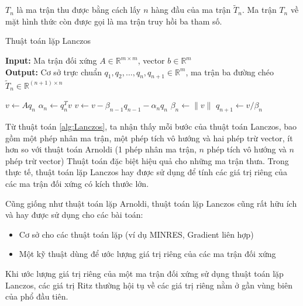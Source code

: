 \documentclass[14pt, a4paper]{article}
\numberwithin{equation}{section}
\numberwithin{algorithm}{section}
\numberwithin{figure}{section}
\numberwithin{dl}{section}
\numberwithin{md}{section}
\numberwithin{bd}{section}
\numberwithin{dn}{section}
\numberwithin{hq}{section}
\begin{document}
$T_n$ là ma trận thu được bằng cách lấy $n$ hàng đầu của ma trận $\widetilde{T}_n$. 
Ma trận $T_n$ về mặt hình thức còn được gọi là ma trận truy hồi ba tham số.

\begin{algorithm}[h!]
    \caption{Thuật toán lặp Lanczos}\label{alg:Lanczos}
    \hspace*{\algorithmicindent} \textbf{Input:} {Ma trận đối xứng $A \in \mathbb{R}^{m \times m}$, vector $b \in \mathbb{R}^m$} \\
    \hspace*{\algorithmicindent} \textbf{Output:} {Cơ sở trực chuẩn $q_1, q_2, \dots, q_n, q_{n+1} \in \mathbb{R}^m$, ma trận ba đường chéo $\widetilde{T}_n \in \mathbb{R}^{(n+1) \times n}$}
    \begin{algorithmic}
            \State $v \leftarrow Aq_n$
            \State $\alpha_n \leftarrow q_n^Tv$
            \State $v \leftarrow v - \beta_{n-1}q_{n-1} - \alpha_n q_n$
            \State $\beta_n \leftarrow \lVert v \rVert$
            \State $q_{n+1} \leftarrow v/\beta_n$
        \EndFor
    \end{algorithmic}
\end{algorithm}

Từ thuật toán \ref{alg:Lanczos}, ta nhận thấy mỗi bước của thuật toán Lanczos, bao gồm một phép nhân ma trận, một phép tích vô hướng và hai phép trừ vector, ít hơn so với thuật toán Arnoldi (1 phép nhân ma trận, $n$ phép tích vô hướng và $n$ phép trừ vector)
Thuật toán đặc biệt hiệu quả cho những ma trận thưa. Trong thực tế, thuật toán lặp Lanczos hay được sử dụng để tính các giá trị riêng của các ma trận đối xứng có kích thước lớn.

Cũng giống như thuật toán lặp Arnoldi, thuật toán lặp Lanczos cũng rất hữu ích và hay được sử dụng cho các bài toán:

\begin{itemize}
    \item Cơ sở cho các thuật toán lặp (ví dụ MINRES, Gradient liên hợp)
    \item Một kỹ thuật dùng để ước lượng giá trị riêng của các ma trận đối xứng
\end{itemize}

Khi ước lượng giá trị riêng của một ma trận đối xứng sử dụng thuật toán lặp Lanczos, các giá trị Ritz thường hội tụ về các giá trị riêng nằm ở gần vùng biên của phổ đầu tiên. 
\end{document}
